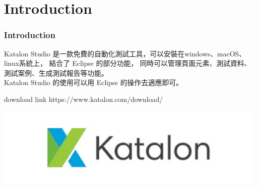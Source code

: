 \documentclass{beamer}
\begin{document}

\fi
\section{Introduction}
\begin{frame}
    \frametitle{Introduction}
    Katalon Studio 是一款免費的自動化測試工具，可以安裝在windows、macOS、linux系統上，
    結合了 Eclipse 的部分功能，
    同時可以管理頁面元素、測試資料、測試案例、生成測試報告等功能。~\\
    Katalon Studio 的使用可以用 Eclipse 的操作去適應即可。
    \begin{block}{download link}
        https://www.katalon.com/download/
    \end{block}
    \includegraphics[width=1\textwidth]{picture/katalonIcon.jpg}
\end{frame}
\end{document}
